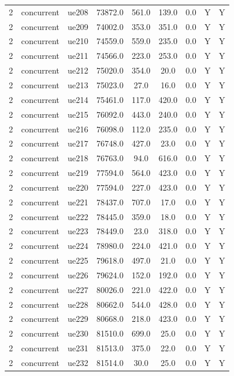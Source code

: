 \begin{table}[ht]
\begin{tabular}{|c|c|c|c|c|c|c|c|c|}
2 & concurrent & ue208 & 73872.0 & 561.0 & 139.0 & 0.0 & Y & Y \\
2 & concurrent & ue209 & 74002.0 & 353.0 & 351.0 & 0.0 & Y & Y \\
2 & concurrent & ue210 & 74559.0 & 559.0 & 235.0 & 0.0 & Y & Y \\
2 & concurrent & ue211 & 74566.0 & 223.0 & 253.0 & 0.0 & Y & Y \\
2 & concurrent & ue212 & 75020.0 & 354.0 & 20.0 & 0.0 & Y & Y \\
2 & concurrent & ue213 & 75023.0 & 27.0 & 16.0 & 0.0 & Y & Y \\
2 & concurrent & ue214 & 75461.0 & 117.0 & 420.0 & 0.0 & Y & Y \\
2 & concurrent & ue215 & 76092.0 & 443.0 & 240.0 & 0.0 & Y & Y \\
2 & concurrent & ue216 & 76098.0 & 112.0 & 235.0 & 0.0 & Y & Y \\
2 & concurrent & ue217 & 76748.0 & 427.0 & 23.0 & 0.0 & Y & Y \\
2 & concurrent & ue218 & 76763.0 & 94.0 & 616.0 & 0.0 & Y & Y \\
2 & concurrent & ue219 & 77594.0 & 564.0 & 423.0 & 0.0 & Y & Y \\
2 & concurrent & ue220 & 77594.0 & 227.0 & 423.0 & 0.0 & Y & Y \\
2 & concurrent & ue221 & 78437.0 & 707.0 & 17.0 & 0.0 & Y & Y \\
2 & concurrent & ue222 & 78445.0 & 359.0 & 18.0 & 0.0 & Y & Y \\
2 & concurrent & ue223 & 78449.0 & 23.0 & 318.0 & 0.0 & Y & Y \\
2 & concurrent & ue224 & 78980.0 & 224.0 & 421.0 & 0.0 & Y & Y \\
2 & concurrent & ue225 & 79618.0 & 497.0 & 21.0 & 0.0 & Y & Y \\
2 & concurrent & ue226 & 79624.0 & 152.0 & 192.0 & 0.0 & Y & Y \\
2 & concurrent & ue227 & 80026.0 & 221.0 & 422.0 & 0.0 & Y & Y \\
2 & concurrent & ue228 & 80662.0 & 544.0 & 428.0 & 0.0 & Y & Y \\
2 & concurrent & ue229 & 80668.0 & 218.0 & 423.0 & 0.0 & Y & Y \\
2 & concurrent & ue230 & 81510.0 & 699.0 & 25.0 & 0.0 & Y & Y \\
2 & concurrent & ue231 & 81513.0 & 375.0 & 22.0 & 0.0 & Y & Y \\
2 & concurrent & ue232 & 81514.0 & 30.0 & 25.0 & 0.0 & Y & Y \\

\end{tabular}
\end{table}
